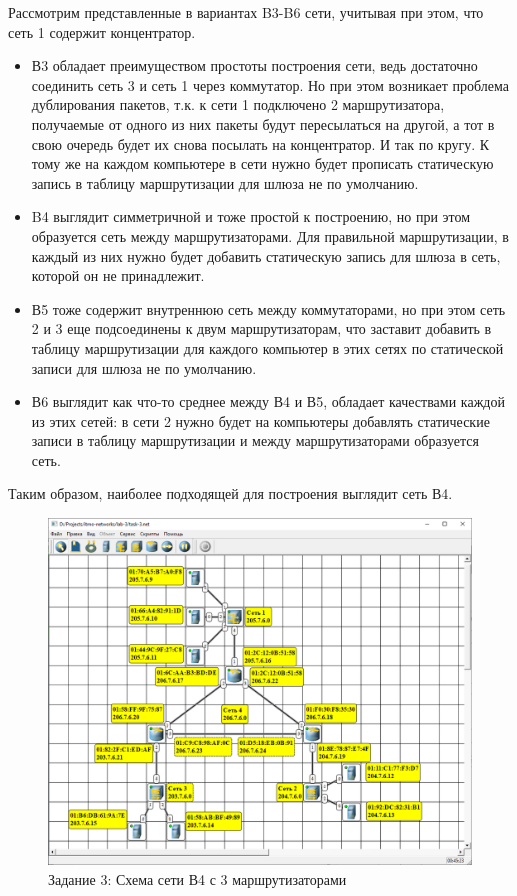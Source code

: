 
Рассмотрим представленные в вариантах B3-B6 сети, учитывая при этом, что сеть 1 содержит концентратор. 

\begin{itemize}
    \item В3 обладает преимуществом простоты построения сети, ведь достаточно соединить сеть 3 и сеть 1 через коммутатор. Но при этом возникает проблема дублирования пакетов, т.к. к сети 1 подключено 2 маршрутизатора, получаемые от одного из них пакеты будут пересылаться на другой, а тот в свою очередь будет их снова посылать на концентратор. И так по кругу. К тому же на каждом компьютере в сети нужно будет прописать статическую запись в таблицу маршрутизации для шлюза не по умолчанию.
    \item B4 выглядит симметричной и тоже простой к построению, но при этом образуется сеть между маршрутизаторами. Для правильной маршрутизации, в каждый из них нужно будет добавить статическую запись для шлюза в сеть, которой он не принадлежит.
    \item В5 тоже содержит внутреннюю сеть между коммутаторами, но при этом сеть 2 и 3 еще подсоединены к двум маршрутизаторам, что заставит добавить в таблицу маршрутизации для каждого компьютер в этих сетях по статической записи для шлюза не по умолчанию.
    \item В6 выглядит как что-то среднее между В4 и В5, обладает качествами каждой из этих сетей: в сети 2 нужно будет на компьютеры добавлять статические записи в таблицу маршрутизации и между маршрутизаторами образуется сеть.
\end{itemize}

Таким образом, наиболее подходящей для построения выглядит сеть В4.

\begin{figure}[H]
    \centering
    \includegraphics[width=1\linewidth]{res/task-3.png}
    \caption{Задание 3: Схема сети В4 с 3 маршрутизаторами}
    \label{fig:task-3}
\end{figure}

